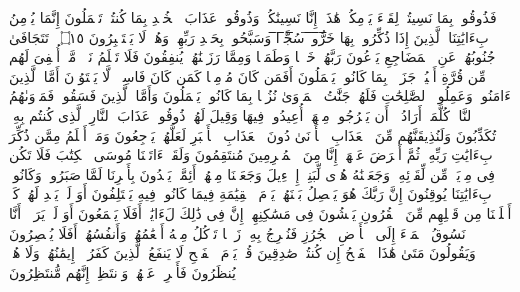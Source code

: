 \stopbuffer%
\startbuffer[\q:32:14]
فَذُوقُوا۟ بِمَا نَسِیتُمۡ لِقَاۤءَ یَوۡمِكُمۡ هَٰذَاۤ إِنَّا نَسِینَٰكُمۡۖ وَذُوقُوا۟ عَذَابَ ٱلۡخُلۡدِ بِمَا كُنتُمۡ تَعۡمَلُونَ%
\stopbuffer%
\startbuffer[\q:32:15]
إِنَّمَا یُؤۡمِنُ بِءَایَٰتِنَا ٱلَّذِینَ إِذَا ذُكِّرُوا۟ بِهَا خَ̅رُّ̅و̅ا۟̅ ̅سُ̅جَّ̅دࣰ̅ا̅ وَسَبَّحُوا۟ بِحَمۡدِ رَبِّهِمۡ وَهُمۡ لَا یَسۡتَكۡبِرُونَ ۝١٥ ۩%
\stopbuffer%
\startbuffer[\q:32:16]
تَتَجَافَىٰ جُنُوبُهُمۡ عَنِ ٱلۡمَضَاجِعِ یَدۡعُونَ رَبَّهُمۡ خَوۡفࣰا وَطَمَعࣰا وَمِمَّا رَزَقۡنَٰهُمۡ یُنفِقُونَ%
\stopbuffer%
\startbuffer[\q:32:17]
فَلَا تَعۡلَمُ نَفۡسࣱ مَّاۤ أُخۡفِیَ لَهُم مِّن قُرَّةِ أَعۡیُنࣲ جَزَاۤءَۢ بِمَا كَانُوا۟ یَعۡمَلُونَ%
\stopbuffer%
\startbuffer[\q:32:18]
أَفَمَن كَانَ مُؤۡمِنࣰا كَمَن كَانَ فَاسِقࣰاۚ لَّا یَسۡتَوُۥنَ%
\stopbuffer%
\startbuffer[\q:32:19]
أَمَّا ٱلَّذِینَ ءَامَنُوا۟ وَعَمِلُوا۟ ٱلصَّٰلِحَٰتِ فَلَهُمۡ جَنَّٰتُ ٱلۡمَأۡوَىٰ نُزُلَۢا بِمَا كَانُوا۟ یَعۡمَلُونَ%
\stopbuffer%
\startbuffer[\q:32:20]
وَأَمَّا ٱلَّذِینَ فَسَقُوا۟ فَمَأۡوَىٰهُمُ ٱلنَّارُۖ كُلَّمَاۤ أَرَادُوۤا۟ أَن یَخۡرُجُوا۟ مِنۡهَاۤ أُعِیدُوا۟ فِیهَا وَقِیلَ لَهُمۡ ذُوقُوا۟ عَذَابَ ٱلنَّارِ ٱلَّذِی كُنتُم بِهِۦ تُكَذِّبُونَ%
\stopbuffer%
\startbuffer[\q:32:21]
وَلَنُذِیقَنَّهُم مِّنَ ٱلۡعَذَابِ ٱلۡأَدۡنَىٰ دُونَ ٱلۡعَذَابِ ٱلۡأَكۡبَرِ لَعَلَّهُمۡ یَرۡجِعُونَ%
\stopbuffer%
\startbuffer[\q:32:22]
وَمَنۡ أَظۡلَمُ مِمَّن ذُكِّرَ بِءَایَٰتِ رَبِّهِۦ ثُمَّ أَعۡرَضَ عَنۡهَاۤۚ إِنَّا مِنَ ٱلۡمُجۡرِمِینَ مُنتَقِمُونَ%
\stopbuffer%
\startbuffer[\q:32:23]
وَلَقَدۡ ءَاتَیۡنَا مُوسَى ٱلۡكِتَٰبَ فَلَا تَكُن فِی مِرۡیَةࣲ مِّن لِّقَاۤئِهِۦۖ وَجَعَلۡنَٰهُ هُدࣰى لِّبَنِیۤ إِسۡرَٰۤءِیلَ%
\stopbuffer%
\startbuffer[\q:32:24]
وَجَعَلۡنَا مِنۡهُمۡ أَئِمَّةࣰ یَهۡدُونَ بِأَمۡرِنَا لَمَّا صَبَرُوا۟ۖ وَكَانُوا۟ بِءَایَٰتِنَا یُوقِنُونَ%
\stopbuffer%
\startbuffer[\q:32:25]
إِنَّ رَبَّكَ هُوَ یَفۡصِلُ بَیۡنَهُمۡ یَوۡمَ ٱلۡقِیَٰمَةِ فِیمَا كَانُوا۟ فِیهِ یَخۡتَلِفُونَ%
\stopbuffer%
\startbuffer[\q:32:26]
أَوَ لَمۡ یَهۡدِ لَهُمۡ كَمۡ أَهۡلَكۡنَا مِن قَبۡلِهِم مِّنَ ٱلۡقُرُونِ یَمۡشُونَ فِی مَسَٰكِنِهِمۡۚ إِنَّ فِی ذَٰلِكَ لَءَایَٰتٍۚ أَفَلَا یَسۡمَعُونَ%
\stopbuffer%
\startbuffer[\q:32:27]
أَوَ لَمۡ یَرَوۡا۟ أَنَّا نَسُوقُ ٱلۡمَاۤءَ إِلَى ٱلۡأَرۡضِ ٱلۡجُرُزِ فَنُخۡرِجُ بِهِۦ زَرۡعࣰا تَأۡكُلُ مِنۡهُ أَنۡعَٰمُهُمۡ وَأَنفُسُهُمۡۚ أَفَلَا یُبۡصِرُونَ%
\stopbuffer%
\startbuffer[\q:32:28]
وَیَقُولُونَ مَتَىٰ هَٰذَا ٱلۡفَتۡحُ إِن كُنتُمۡ صَٰدِقِینَ%
\stopbuffer%
\startbuffer[\q:32:29]
قُلۡ یَوۡمَ ٱلۡفَتۡحِ لَا یَنفَعُ ٱلَّذِینَ كَفَرُوۤا۟ إِیمَٰنُهُمۡ وَلَا هُمۡ یُنظَرُونَ%
\stopbuffer%
\startbuffer[\q:32:30]
فَأَعۡرِضۡ عَنۡهُمۡ وَٱنتَظِرۡ إِنَّهُم مُّنتَظِرُونَ%
\stopbuffer%
\startbuffer[\q:33:1]
